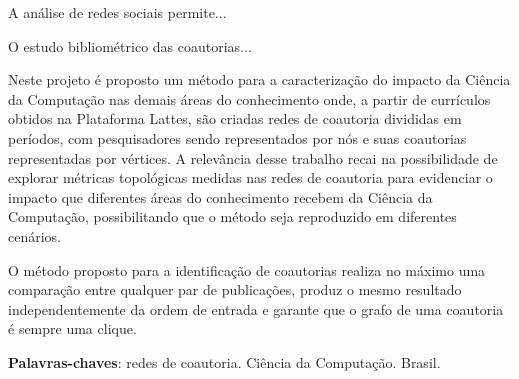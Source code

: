 
\setlength{\absparsep}{18pt} %
\begin{resumo}
   A análise de redes sociais permite...
   
   O estudo bibliométrico das coautorias...
   
   Neste projeto é proposto um método para a caracterização do impacto da Ciência da Computação nas demais áreas do conhecimento onde, a partir de currículos obtidos na Plataforma Lattes, são criadas redes de coautoria divididas em períodos, com pesquisadores sendo representados por nós e suas coautorias representadas por vértices. A relevância desse trabalho recai na possibilidade de explorar métricas topológicas medidas nas redes de coautoria para evidenciar o impacto que diferentes áreas do conhecimento recebem da Ciência da Computação, possibilitando que o método seja reproduzido em diferentes cenários.
    
    O método proposto para a identificação de coautorias realiza no máximo uma comparação entre qualquer par de publicações, produz o mesmo resultado independentemente da ordem de entrada e garante que o grafo de uma coautoria é sempre uma clique.

    \textbf{Palavras-chaves}: redes de coautoria. Ciência da Computação. Brasil.
\end{resumo}
